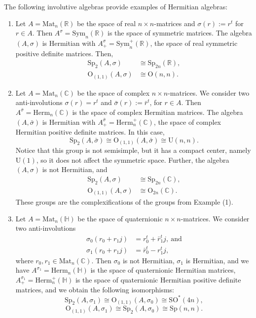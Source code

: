 \documentclass[oneside,11pt]{amsart}
\theoremstyle{definition}
\theoremstyle{remark}
\numberwithin{thm}{section}
\numberwithin{equation}{section}
\begin{document}
The following involutive algebras provide examples of Hermitian algebras:
\begin{enumerate}
    \item Let $A=\mathrm{Mat}_n(\mathbb{R})$ be the space of real $n\times n$-matrices and $\sigma(r):=r^t$ for $r\in A$. Then $A^\sigma=\mathrm{Sym}_n(\mathbb{R})$ is the space of symmetric matrices. The algebra $(A,\sigma)$ is Hermitian with $A^{\sigma}_+=\mathrm{Sym}^+_n(\mathbb{R})$, the space of real symmetric positive definite matrices. Then,
    \begin{align*}\mathrm{Sp}_2(A,\sigma) & \cong \mathrm{Sp}_{2n}(\mathbb R),\\
    \mathrm{O}_{(1,1)}(A,\sigma) & \cong\mathrm{O}(n,n).
    \end{align*}

    \item Let $A=\mathrm{Mat}_n(\mathbb{C})$ be the space of complex $n\times n$-matrices. We consider two anti-involutions $\sigma(r)=r^t$ and $\bar\sigma(r):=\bar r^t$, for $r\in A$. Then $A^{\bar\sigma}=\mathrm{Herm}_n(\mathbb{C})$ is the space of complex Hermitian matrices. The algebra $(A,\bar\sigma)$ is Hermitian with $A^{\bar\sigma}_+=\mathrm{Herm}^+_n(\mathbb{C})$, the space of complex Hermitian positive definite matrices. In this case, 
    \begin{equation}\label{eq:U(n,n)}
    \mathrm{Sp}_2(A,\bar\sigma)\cong\mathrm{O}_{(1,1)}(A,\bar\sigma)\cong\mathrm{U}(n,n).\end{equation}
    Notice that this group is not semisimple, but it has a compact center, namely $\mathrm U(1)$, so it does not affect the symmetric space. Further, the algebra $(A,\sigma)$ is not Hermitian, and 
    \begin{align*}
    \mathrm{Sp}_2(A,\sigma) & \cong\mathrm{Sp}_{2n}(\mathbb C),\\
    \mathrm{O}_{(1,1)}(A,\sigma) & \cong\mathrm{O}_{2n}(\mathbb C).
    \end{align*}
    These groups are the complexifications of the groups from Example (1).
    \vspace{2mm}
    
    \item Let $A=\mathrm{Mat}_n(\mathbb{H})$ be the space of quaternionic $n\times n$-matrices. We consider two anti-involutions 
    \begin{align*}
        \sigma_0(r_0+r_1j)&=r_0^t+\bar r_1^tj,\ \text{and}\\
        \sigma_1(r_0+r_1j)&=\bar r_0^t- r_1^tj,
    \end{align*} 
    where $r_0,r_1\in\mathrm{Mat}_n(\mathbb C)$. Then $\sigma_0$ is not Hermitian, $\sigma_1$ is Hermitian, and we have $A^{\sigma_1}=\mathrm{Herm}_n(\mathbb{H})$ is the space of quaternionic Hermitian matrices, $A^{\sigma_1}_+=\mathrm{Herm}^+_n(\mathbb{H})$ is the space of quaternionic Hermitian positive definite matrices, and we obtain the following isomorphisms:
    $$\mathrm{Sp}_2(A,\sigma_1)\cong\mathrm{O}_{(1,1)}(A,\sigma_0)\cong\mathrm{SO}^*(4n),$$    \begin{equation}\label{eq:Sp(n,n)}
    \mathrm{O}_{(1,1)}(A,\sigma_1)\cong\mathrm{Sp}_2(A,\sigma_0)\cong\mathrm{Sp}(n,n).
    \end{equation}
    

\end{enumerate}
\end{document}
